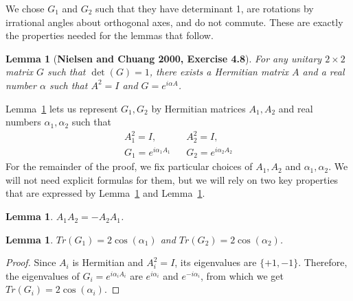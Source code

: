 \documentclass[11pt]{article}
\newtheorem{lemma}[theorem]{Lemma}
\begin{document}
We chose $G_1$ and $G_2$ such that
they have determinant 1, 
are rotations by irrational angles about orthogonal axes, and 
do not commute. 
These are exactly the properties needed for the lemmas that follow.

\begin{lemma}[\bf Nielsen and Chuang 2000, Exercise 4.8]
\label{lem:from-unitary-to-exponentiated-hamiltonian}
For any unitary $2 \times 2$ matrix $G$ such that $\det(G) = 1$,
there exists a Hermitian matrix $A$ and a real number $\alpha$
such that $A^2 = I$ and $G = e^{i\alpha A}$.
\end{lemma}

Lemma~\ref{lem:from-unitary-to-exponentiated-hamiltonian} lets us represent
$G_1,G_2$ by Hermitian matrices $A_1,A_2$ and real numbers $\alpha_1,\alpha_2$ 
such that
\begin{eqnarray}
A_1^2=I,
&&
A_2^2=I,
\label{eq:a1-squared-equals-a2-squared-equals-i}
\\
G_1 = e^{i\alpha_1 A_1}
&&
G_2 = e^{i\alpha_2 A_2}
\label{eq:g1-equals-the-exponentiation-of-h1-and-same-for-g2}
\end{eqnarray}
For the remainder of the proof, we fix particular choices of $A_1,A_2$ and 
$\alpha_1,\alpha_2$.
We will not need explicit formulas for them, but we will rely on
two key properties that are expressed by
Lemma~\ref{lem:a1-and-a2-anticommute} and
Lemma~\ref{lem:trace-of-g1-and-trace-of-g2-expressed-via-alphas}.

\newpage

\begin{lemma}
\label{lem:a1-and-a2-anticommute}
$A_1 A_2 = - A_2 A_1$.
\end{lemma}


\begin{lemma}
\label{lem:trace-of-g1-and-trace-of-g2-expressed-via-alphas}
$Tr(G_1) = 2 \cos(\alpha_1)$ and
$Tr(G_2) = 2 \cos(\alpha_2)$.
\end{lemma}

\begin{proof}
Since $A_i$ is Hermitian and $A_i^2 = I$, its eigenvalues are $\{+1,-1\}$.
Therefore, the eigenvalues of $G_i = e^{i\alpha_i A_i}$ are
$e^{i\alpha_i}$ and $e^{-i\alpha_i}$,
from which we get
$Tr(G_i) = 2 \cos(\alpha_i)$.
\end{proof}
\end{document}
